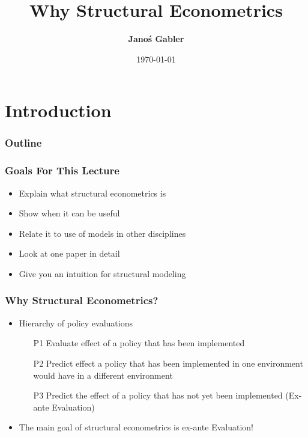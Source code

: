 \documentclass[11pt]{beamer}
\author[Janoś Gabler]
{
{\bf Janoś Gabler}}
\begin{document}
\title{Why Structural Econometrics}
\date{\today}

\begin{frame}
    \maketitle
    \note{~}
\end{frame}

\section{Introduction}

\begin{frame}\frametitle{Outline}
  \hspace{1cm}\begin{minipage}{\textwidth}
    \tableofcontents[hideallsubsections]
  \end{minipage}
\end{frame}


\begin{frame}[c]\frametitle{Goals For This Lecture}
    \begin{itemize}
        \item Explain what structural econometrics is
        \item Show when it can be useful
        \item Relate it to use of models in other disciplines
        \item Look at one paper in detail
        \item Give you an intuition for structural modeling
    \end{itemize}
\end{frame}



\begin{frame}[c]\frametitle{Why Structural Econometrics?}
    \begin{itemize}
        \item Hierarchy of policy evaluations
        \begin{enumerate}
            \item[P1] Evaluate effect of a policy that has been implemented
            \item[P2] Predict effect a policy that has been implemented in one environment would have in a different environment
            \item[P3] Predict the effect of a policy that has not yet been implemented (Ex-ante Evaluation)
        \end{enumerate}
        \item The main goal of structural econometrics is ex-ante Evaluation!
    \end{itemize}
\end{frame}
\end{document}
